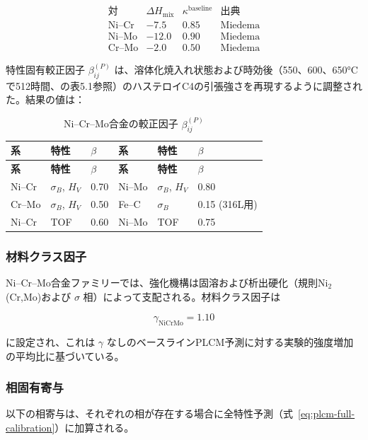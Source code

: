 \documentclass[12pt,a4paper]{article}
\begin{document}
	\[
	\begin{array}{lccc}
		\text{対} & \Delta H_{\text{mix}} & \kappa^{\text{baseline}} & \text{出典} \\
		\hline
		\text{Ni–Cr} & -7.5 & 0.85 & \text{Miedema} \\
		\text{Ni–Mo} & -12.0 & 0.90 & \text{Miedema} \\
		\text{Cr–Mo} & -2.0 & 0.50 & \text{Miedema}
	\end{array}
	\]
	
	特性固有較正因子 $\beta_{ij}^{(P)}$ は、溶体化焼入れ状態および時効後（550、600、650°Cで512時間、\cite{dis2025}の表5.1参照）のハステロイC4の引張強さを再現するように調整された。結果の値は：
	
	\begin{longtable}{p{1.5cm} p{1.5cm} p{1.5cm} p{1.5cm} p{1.5cm} p{1.5cm}}
		\caption{Ni–Cr–Mo合金の較正因子 $\beta_{ij}^{(P)}$}\label{tab:nicrmo_beta}\\
		\toprule
		\textbf{系} & \textbf{特性} & $\beta$ & \textbf{系} & \textbf{特性} & $\beta$ \\
		\midrule
		\endfirsthead
		\toprule
		\textbf{系} & \textbf{特性} & $\beta$ & \textbf{系} & \textbf{特性} & $\beta$ \\
		\midrule
		\endhead
		Ni–Cr   & $\sigma_B$, $H_V$ & 0.70 & Ni–Mo   & $\sigma_B$, $H_V$ & 0.80 \\
		Cr–Mo   & $\sigma_B$, $H_V$ & 0.50 & Fe–C    & $\sigma_B$        & 0.15 (316L用) \\
		Ni–Cr   & TOF              & 0.60 & Ni–Mo   & TOF              & 0.75 \\
		\bottomrule
	\end{longtable}
	
	\subsubsection{材料クラス因子}
	Ni–Cr–Mo合金ファミリーでは、強化機構は固溶および析出硬化（規則Ni$_2$(Cr,Mo)および $\sigma$ 相）によって支配される。材料クラス因子は
	
	\[
	\gamma_{\text{NiCrMo}} = 1.10
	\]
	
	に設定され、これは $\gamma$ なしのベースラインPLCM予測に対する実験的強度増加の平均比に基づいている。
	
	\subsubsection{相固有寄与}
	以下の相寄与は、それぞれの相が存在する場合に全特性予測（式~\ref{eq:plcm-full-calibration}）に加算される。
	
\end{document}
